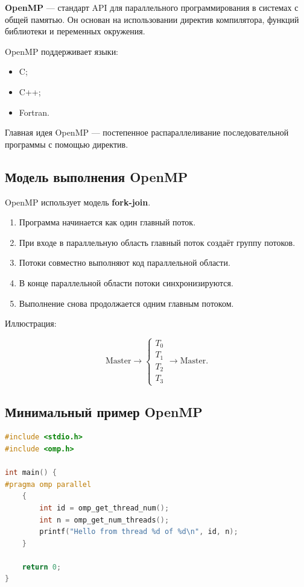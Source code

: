 \documentclass[12pt,a4paper]{article}
\begin{document}
\textbf{OpenMP} --- стандарт API для параллельного программирования в системах с общей памятью. Он основан на использовании директив компилятора, функций библиотеки и переменных окружения.

OpenMP поддерживает языки:
\begin{itemize}
    \item C;
    \item C++;
    \item Fortran.
\end{itemize}

Главная идея OpenMP --- постепенное распараллеливание последовательной программы с помощью директив.

\subsection{Модель выполнения OpenMP}

OpenMP использует модель \textbf{fork-join}.

\begin{enumerate}
    \item Программа начинается как один главный поток.
    \item При входе в параллельную область главный поток создаёт группу потоков.
    \item Потоки совместно выполняют код параллельной области.
    \item В конце параллельной области потоки синхронизируются.
    \item Выполнение снова продолжается одним главным потоком.
\end{enumerate}

Иллюстрация:

\[
\text{Master}
\rightarrow
\begin{cases}
T_0\\
T_1\\
T_2\\
T_3
\end{cases}
\rightarrow
\text{Master}.
\]

\subsection{Минимальный пример OpenMP}

\begin{lstlisting}[language=C]
#include <stdio.h>
#include <omp.h>

int main() {
#pragma omp parallel
    {
        int id = omp_get_thread_num();
        int n = omp_get_num_threads();
        printf("Hello from thread %d of %d\n", id, n);
    }

    return 0;
}
\end{lstlisting}
\end{document}
